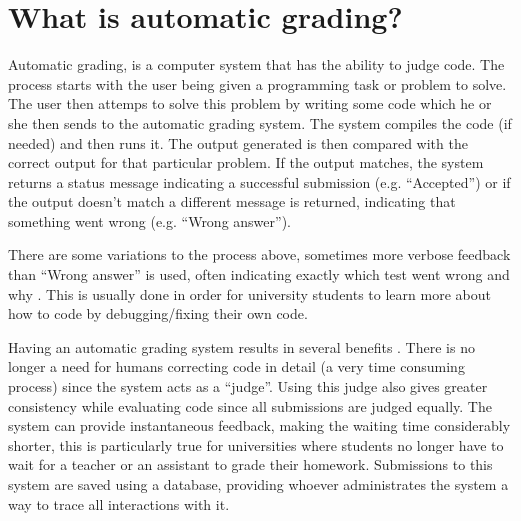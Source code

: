 \section{What is automatic grading?}
Automatic grading, is a computer system that has the ability to judge code. The process starts with the user being given a programming task or problem to solve. The user then attemps to solve this problem by writing some code which he or she then sends to the automatic grading system. The system compiles the code (if needed) and then runs it. The output generated is then compared with the correct output for that particular problem. If the output matches, the system returns a status message indicating a successful submission (e.g. ``Accepted'') or if the output doesn't match a different message is returned, indicating that something went wrong (e.g. ``Wrong answer''). 

There are some variations to the process above, sometimes more verbose feedback than ``Wrong answer'' is used, often indicating exactly which test went wrong and why \cite{Gradebot}. This is usually done in order for university students to learn more about how to code by debugging/fixing their own code.

Having an automatic grading system results in several benefits \cite{Suleman}. There is no longer a need for humans correcting code in detail (a very time consuming process) since the system acts as a ``judge''. Using this judge also gives greater consistency while evaluating code since all submissions are judged equally. The system can provide instantaneous feedback, making the waiting time considerably shorter, this is particularly true for universities where students no longer have to wait for a teacher or an assistant to grade their homework. Submissions to this system are saved using a database, providing whoever administrates the system a way to trace all interactions with it.
